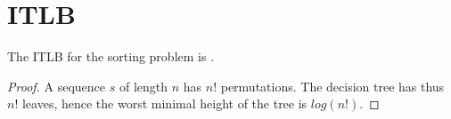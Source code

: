 \section{ITLB}
\label{tree:sorting:ITLB}

\begin{theorem}
The ITLB for the sorting problem is .
\end{theorem}

\begin{proof}
A sequence $s$ of length $n$ has $n!$ permutations. The decision tree has thus $n!$ leaves, hence the worst minimal height of the tree is $log(n!)$.
\end{proof}